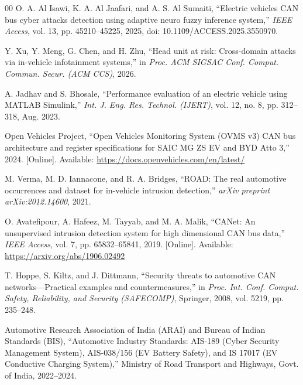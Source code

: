 \documentclass[conference]{IEEEtran}
\begin{document}
\begin{thebibliography}{00}
O. A. Al Isawi, K. A. Al Jaafari, and A. S. Al Sumaiti, ``Electric vehicles CAN bus cyber attacks detection using adaptive neuro fuzzy inference system,'' \textit{IEEE Access}, vol. 13, pp. 45210--45225, 2025, doi: 10.1109/ACCESS.2025.3550970.

Y. Xu, Y. Meng, G. Chen, and H. Zhu, ``Head unit at risk: Cross-domain attacks via in-vehicle infotainment systems,'' in \textit{Proc. ACM SIGSAC Conf. Comput. Commun. Secur. (ACM CCS)}, 2026.

A. Jadhav and S. Bhosale, ``Performance evaluation of an electric vehicle using MATLAB Simulink,'' \textit{Int. J. Eng. Res. Technol. (IJERT)}, vol. 12, no. 8, pp. 312--318, Aug. 2023.

Open Vehicles Project, ``Open Vehicles Monitoring System (OVMS v3) CAN bus architecture and register specifications for SAIC MG ZS EV and BYD Atto 3,'' 2024. [Online]. Available: \url{https://docs.openvehicles.com/en/latest/}

M. Verma, M. D. Iannacone, and R. A. Bridges, ``ROAD: The real automotive occurrences and dataset for in-vehicle intrusion detection,'' \textit{arXiv preprint arXiv:2012.14600}, 2021.

O. Avatefipour, A. Hafeez, M. Tayyab, and M. A. Malik, ``CANet: An unsupervised intrusion detection system for high dimensional CAN bus data,'' \textit{IEEE Access}, vol. 7, pp. 65832--65841, 2019. [Online]. Available: \url{https://arxiv.org/abs/1906.02492}

T. Hoppe, S. Kiltz, and J. Dittmann, ``Security threats to automotive CAN networks---Practical examples and countermeasures,'' in \textit{Proc. Int. Conf. Comput. Safety, Reliability, and Security (SAFECOMP)}, Springer, 2008, vol. 5219, pp. 235--248.

Automotive Research Association of India (ARAI) and Bureau of Indian Standards (BIS), ``Automotive Industry Standards: AIS-189 (Cyber Security Management System), AIS-038/156 (EV Battery Safety), and IS 17017 (EV Conductive Charging System),'' Ministry of Road Transport and Highways, Govt. of India, 2022--2024.

\end{thebibliography}
\end{document}
